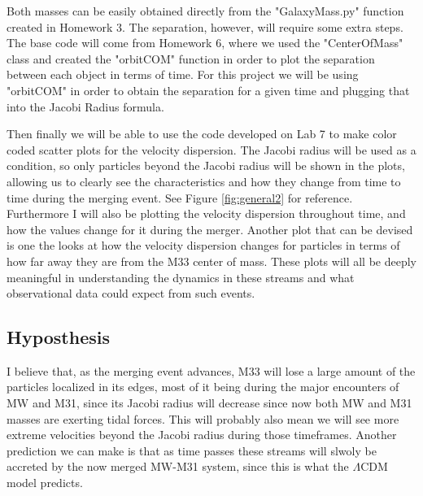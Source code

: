 \documentclass[linenumbers,trackchanges]{aastex7}
\begin{document}
Both masses can be easily obtained directly from the "GalaxyMass.py" function created in Homework 3. The separation, however, will require some extra steps. The base code will come from Homework 6, where we used the "CenterOfMass" class and created the "orbitCOM" function in order to plot the separation between each object in terms of time. For this project we will be using "orbitCOM" in order to obtain the separation for a given time and plugging that into the Jacobi Radius formula.

Then finally we will be able to use the code developed on Lab 7 to make color coded scatter plots for the velocity dispersion. The Jacobi radius will be used as a condition, so only particles beyond the Jacobi radius will be shown in the plots, allowing us to clearly see the characteristics and how they change from time to time during the merging event. See Figure \ref{fig:general2} for reference. Furthermore I will also be plotting the velocity dispersion throughout time, and how the values change for it during the merger. Another plot that can be devised is one the looks at how the velocity dispersion changes for particles in terms of how far away they are from the M33 center of mass. These plots will all be deeply meaningful in understanding the dynamics in these streams and what observational data could expect from such events.

\begin{figure*}[h!]
\caption{Diagram illustrating the steps that need to be taken in order to obtain velocity dispersion and gradient plots of particles located beyond the Jacobi radius (No longer bound by M33). In blue we can see more detailed explanations for how each function developed during an assignment will be used.
\label{fig:general2}}
\end{figure*}



\subsection{Hyposthesis}

I believe that, as the merging event advances, M33 will lose a large amount of the particles localized in its edges, most of it being during the major encounters of MW and M31, since its Jacobi radius will decrease since now both MW and M31 masses are exerting tidal forces. This will probably also mean we will see more extreme velocities beyond the Jacobi radius during those timeframes. Another prediction we can make is that as time passes these streams will slwoly be accreted by the now merged MW-M31 system, since this is what the $\Lambda$CDM model predicts.
\end{document}
